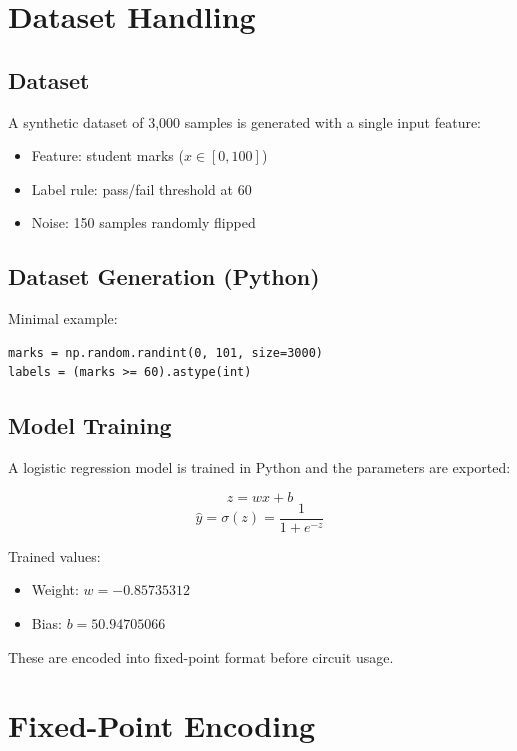 \section{Dataset Handling}\label{sec:dataset}

\subsection{Dataset}
A synthetic dataset of 3,000 samples is generated with a single input feature:

\begin{itemize}
    \item Feature: student marks (\( x \in [0,100] \))
    \item Label rule: pass/fail threshold at 60
    \item Noise: 150 samples randomly flipped
\end{itemize}

\subsection{Dataset Generation (Python)}
Minimal example:

\begin{verbatim}
marks = np.random.randint(0, 101, size=3000)
labels = (marks >= 60).astype(int)
\end{verbatim}

\subsection{Model Training}
A logistic regression model is trained in Python and the parameters are exported:

\[
z = w x + b
\]
\[
\hat{y} = \sigma(z) = \frac{1}{1 + e^{-z}}
\]

Trained values:
\begin{itemize}
    \item Weight: \( w = -0.85735312 \)
    \item Bias: \( b = 50.94705066 \)
\end{itemize}

These are encoded into fixed-point format before circuit usage.

\section{Fixed-Point Encoding}\label{sec:fixed}

